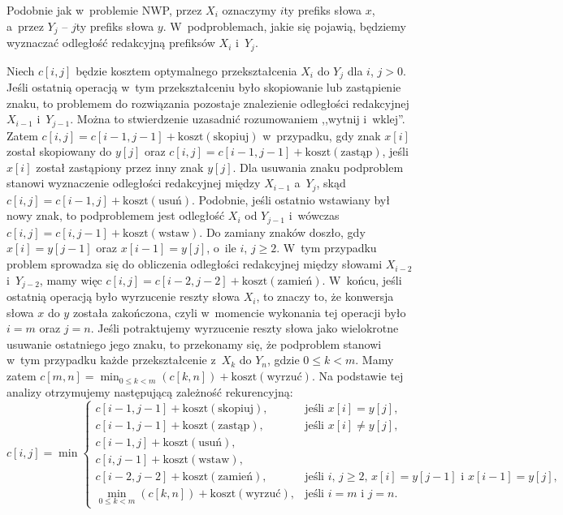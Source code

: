 
\subproblem %
Podobnie jak w~problemie NWP, przez $X_i$ oznaczymy $i$\nbhyphen ty prefiks słowa $x$, a~przez $Y_j$ -- $j$\nbhyphen ty prefiks słowa $y$.
W~podproblemach, jakie się pojawią, będziemy wyznaczać odległość redakcyjną prefiksów $X_i$ i~$Y_j$.

Niech $c[i,j]$ będzie kosztem optymalnego przekształcenia $X_i$ do $Y_j$ dla $i$, $j>0$.
Jeśli ostatnią operacją w~tym przekształceniu było skopiowanie lub zastąpienie znaku, to problemem do rozwiązania pozostaje znalezienie odległości redakcyjnej $X_{i-1}$ i~$Y_{j-1}$.
Można to stwierdzenie uzasadnić rozumowaniem ,,wytnij i~wklej''.
Zatem $c[i,j]=c[i-1,j-1]+\mathrm{koszt}(\text{skopiuj})$ w~przypadku, gdy znak $x[i]$ został skopiowany do $y[j]$ oraz $c[i,j]=c[i-1,j-1]+\mathrm{koszt}(\text{zastąp})$, jeśli $x[i]$ został zastąpiony przez inny znak $y[j]$.
Dla usuwania znaku podproblem stanowi wyznaczenie odległości redakcyjnej między $X_{i-1}$ a~$Y_j$, skąd $c[i,j]=c[i-1,j]+\mathrm{koszt}(\text{usuń})$.
Podobnie, jeśli ostatnio wstawiany był nowy znak, to podproblemem jest odległość $X_i$ od $Y_{j-1}$ i~wówczas $c[i,j]=c[i,j-1]+\mathrm{koszt}(\text{wstaw})$.
Do zamiany znaków doszło, gdy $x[i]=y[j-1]$ oraz $x[i-1]=y[j]$, o~ile $i$, $j\ge2$.
W~tym przypadku problem sprowadza się do obliczenia odległości redakcyjnej między słowami $X_{i-2}$ i~$Y_{j-2}$, mamy więc $c[i,j]=c[i-2,j-2]+\mathrm{koszt}(\text{zamień})$.
W~końcu, jeśli ostatnią operacją było wyrzucenie reszty słowa $X_i$, to znaczy to, że konwersja słowa $x$ do $y$ została zakończona, czyli w~momencie wykonania tej operacji było $i=m$ oraz $j=n$.
Jeśli potraktujemy wyrzucenie reszty słowa jako wielokrotne usuwanie ostatniego jego znaku, to przekonamy się, że podproblem stanowi w~tym przypadku każde przekształcenie z~$X_k$ do $Y_n$, gdzie $0\le k<m$.
Mamy zatem $c[m,n]=\min_{0\le k<m}(c[k,n])+\mathrm{koszt}(\text{wyrzuć})$.
Na podstawie tej analizy otrzymujemy następującą zależność rekurencyjną:
\[
	c[i,j] = \min\begin{cases}
		c[i-1,j-1]+\mathrm{koszt}(\text{skopiuj}), & \text{jeśli $x[i]=y[j]$}, \\
		c[i-1,j-1]+\mathrm{koszt}(\text{zastąp}), & \text{jeśli $x[i]\ne y[j]$}, \\
		c[i-1,j]+\mathrm{koszt}(\text{usuń}), \\
		c[i,j-1]+\mathrm{koszt}(\text{wstaw}), \\
		c[i-2,j-2]+\mathrm{koszt}(\text{zamień}), & \text{jeśli $i$, $j\ge2$, $x[i]=y[j-1]$ i~$x[i-1]=y[j]$}, \\
		\displaystyle\min_{0\le k<m}(c[k,n])+\mathrm{koszt}(\text{wyrzuć}), & \text{jeśli $i=m$ i~$j=n$}.
	\end{cases}
\]

